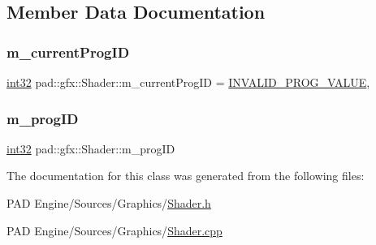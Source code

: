 \subsection{Member Data Documentation}
\mbox{\label{classpad_1_1gfx_1_1_shader_ad9eaa6681fa2cc603230d1ed006c6fe3}} 
\subsubsection{\texorpdfstring{m\+\_\+current\+Prog\+ID}{m\_currentProgID}}
{\footnotesize\ttfamily \mbox{\hyperlink{namespacepad_a7faacd72761782d8adef66f2feba3c21}{int32}} pad\+::gfx\+::\+Shader\+::m\+\_\+current\+Prog\+ID = \mbox{\hyperlink{_shader_8cpp_a9fe0beb08874420b17d7de8e9479f59c}{I\+N\+V\+A\+L\+I\+D\+\_\+\+P\+R\+O\+G\+\_\+\+V\+A\+L\+UE}}\hspace{0.3cm}{\ttfamily [static]}, {\ttfamily [private]}}

\mbox{\label{classpad_1_1gfx_1_1_shader_aad9b828da5a2b4c510a186f23f2cb633}} 
\subsubsection{\texorpdfstring{m\+\_\+prog\+ID}{m\_progID}}
{\footnotesize\ttfamily \mbox{\hyperlink{namespacepad_a7faacd72761782d8adef66f2feba3c21}{int32}} pad\+::gfx\+::\+Shader\+::m\+\_\+prog\+ID\hspace{0.3cm}{\ttfamily [private]}}



The documentation for this class was generated from the following files\+:\begin{DoxyCompactItemize}
\item 
P\+A\+D Engine/\+Sources/\+Graphics/\mbox{\hyperlink{_shader_8h}{Shader.\+h}}\item 
P\+A\+D Engine/\+Sources/\+Graphics/\mbox{\hyperlink{_shader_8cpp}{Shader.\+cpp}}\end{DoxyCompactItemize}
